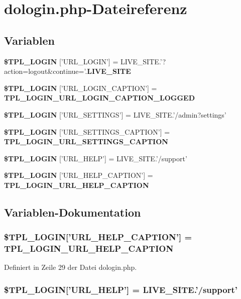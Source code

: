 \section{dologin.php-Dateireferenz}
\label{dologin_8php}
\subsection*{Variablen}
\begin{CompactItemize}
\item 
{\bf \$TPL\_\-LOGIN} ['URL\_\-LOGIN'] = LIVE\_\-SITE.'?action=logout\&continue='.{\bf LIVE\_\-SITE}
\item 
{\bf \$TPL\_\-LOGIN} ['URL\_\-LOGIN\_\-CAPTION'] = {\bf TPL\_\-LOGIN\_\-URL\_\-LOGIN\_\-CAPTION\_\-LOGGED}
\item 
{\bf \$TPL\_\-LOGIN} ['URL\_\-SETTINGS'] = LIVE\_\-SITE.'/admin?settings'
\item 
{\bf \$TPL\_\-LOGIN} ['URL\_\-SETTINGS\_\-CAPTION'] = {\bf TPL\_\-LOGIN\_\-URL\_\-SETTINGS\_\-CAPTION}
\item 
{\bf \$TPL\_\-LOGIN} ['URL\_\-HELP'] = LIVE\_\-SITE.'/support'
\item 
{\bf \$TPL\_\-LOGIN} ['URL\_\-HELP\_\-CAPTION'] = {\bf TPL\_\-LOGIN\_\-URL\_\-HELP\_\-CAPTION}
\end{CompactItemize}


\subsection{Variablen-Dokumentation}
\subsubsection{\setlength{\rightskip}{0pt plus 5cm}\$TPL\_\-LOGIN['URL\_\-HELP\_\-CAPTION'] = {\bf TPL\_\-LOGIN\_\-URL\_\-HELP\_\-CAPTION}}\label{dologin_8php_0877bc2ef5737a17fbf99c05aecbe2c5}




Definiert in Zeile 29 der Datei dologin.php.
\subsubsection{\setlength{\rightskip}{0pt plus 5cm}\$TPL\_\-LOGIN['URL\_\-HELP'] = LIVE\_\-SITE.'/support'}\label{dologin_8php_ca4384ca0ee3ed8fa6abbc724147beae}




